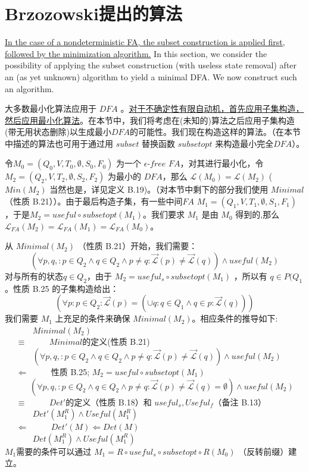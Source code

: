 \chapter{Brzozowski提出的算法}

\uline{In the case of a nondeterministic FA, the subset construction is applied first, followed by the minimization algorithm.} In this section, we consider the possibility of applying the subset construction (with useless state removal) after an (as yet unknown) algorithm to yield a minimal DFA. We now construct such an algorithm.

大多数最小化算法应用于 $DFA$ 。\uline{对于不确定性有限自动机，首先应用子集构造，然后应用最小化算法}。在本节中，我们将考虑在(未知的)算法之后应用子集构造(带无用状态删除)以生成最小$DFA$的可能性。我们现在构造这样的算法。（在本节中描述的算法也可用于通过用 $subset$ 替换函数 $subsetopt$ 来构造最小完全$DFA$）。

令$M_0 = (Q_0,V,T_0,\emptyset ,S_0,F_0)$ 为一个 $\epsilon$-$free$ $FA$，对其进行最小化，令 $M_2 = ( Q_2,V,T_2,\emptyset,S_2,F_2 ) $ 为最小的 $DFA$，那么 $ \mathcal{L} (M_0) = \mathcal{L}(M_2) $ ( $Min(M_2)$ 当然也是，详见定义 B.19)。（对本节中剩下的部分我们使用 $Minimal$（性质 B.21））。由于最后构造子集，有一些中间$FA$ $M_1 = ( Q_1,V,T_1,\emptyset,S_1,F_1 )$，于是$M_2 = useful \circ subsetopt(M_1)$。我们要求 $M_1$ 是由 $M_0$ 得到的,那么 $ \mathcal{L}_{FA}(M_2) = \mathcal{L}_{FA}(M_1) = \mathcal{L}_{FA}(M_0)$。

从 $Minimal(M_2)$  （性质 B.21）开始，我们需要：
$$ (\forall p,q,:p\in Q_2 \land q \in Q_2 \land p \not= q : \overrightarrow{\mathcal{L}}(p) \not= \overrightarrow{\mathcal{L}}(q)) \land useful(M_2)   $$ 
对与所有的状态$q\in Q_2$，由于 $M_2 = useful_s \circ subsetopt(M_1)$ ，所以有 $q\in P(Q_1$ 。性质 B.25 的子集构造给出： 
$$ (\forall p:p\in Q_2 : \overrightarrow{\mathcal{L}}(p) = (\cup q:q \in Q_1 \land q \in p:\overrightarrow{\mathcal{L}}(q)) ) $$ 
我们需要 $M_1$ 上充足的条件来确保 $Minimal(M_2)$。相应条件的推导如下: \\
\mbox{　　　} $Minimal(M_2)$ \\
\mbox{　} $\equiv$ \mbox{　　} {$Minimal$的定义(性质 B.21)} \\
\mbox{　　　} $ (\forall p,q,:p\in Q_2 \land q \in Q_2 \land p \not= q : \overrightarrow{\mathcal{L}}(p) \not= \overrightarrow{\mathcal{L}}(q)) \land useful(M_2)$ \\
\mbox{　} $ \Leftarrow $ \mbox{　　} { 性质 B.25; $M_2 = useful \circ subsetopt(M_1)$ } \\
\mbox{　　　}$ (\forall p,q,:p\in Q_2 \land q \in Q_2 \land p \not= q : \overrightarrow{\mathcal{L}}(p) \not= \overrightarrow{\mathcal{L}}(q) = \emptyset) \land useful(M_2)$ \\
\mbox{　} $\equiv $ \mbox{　　} {$Det'$的定义（性质 B.18）和 $useful_s, Useful_f $（备注 B.13） } \\
\mbox{　　　} $Det'(M^R_1) \land Useful(M^R_1)$ \\
\mbox{　} $\Leftarrow $ \mbox{　　} {$Det'(M) \Leftarrow Det(M)$} \\
\mbox{　　　} $Det(M^R_1) \land Useful(M^R_1)$ \\
$M_1$需要的条件可以通过 $M_1=R \circ useful_s \circ subsetopt \circ R(M_0)$ （反转前缀）建立。


